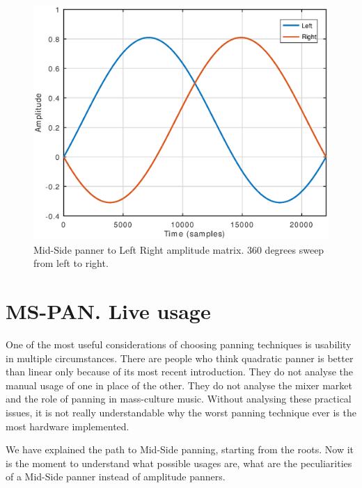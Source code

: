 \documentclass{article}
\begin{document}
\begin{figure}[h]
\centering
\includegraphics[width=1\columnwidth]{mspanlr}
\caption{Mid-Side panner to Left Right amplitude matrix. 360 degrees sweep from left to right.\label{fig:mspanlr}}
\end{figure}

\vfill\null

\newpage

\section{MS-PAN. Live usage}
\label{sec:mspanlive}

One of the most useful considerations of choosing panning techniques is usability in multiple circumstances. There are people who think quadratic panner is better than linear only because of its most recent introduction. They do not analyse the manual usage of one in place of the other. They do not analyse the mixer market and the role of panning in mass-culture music. Without analysing these practical issues, it is not really understandable why the worst panning technique ever is the most hardware implemented.  

We have explained the path to Mid-Side panning, starting from the roots. Now it is the moment to understand what possible usages are, what are the peculiarities of a Mid-Side panner instead of amplitude panners. 
\end{document}
